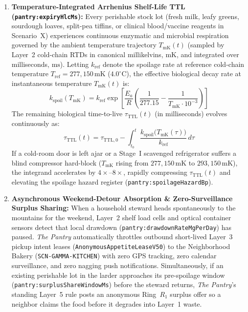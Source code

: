 \begin{enumerate}
    \item \textbf{Temperature-Integrated Arrhenius Shelf-Life TTL (\texttt{pantry:expiryHlcMs}):} Every perishable stock lot (fresh milk, leafy greens, sourdough loaves, split-pea tiffins, or clinical blood/vaccine reagents in Scenario~$\mathrm{X}$) experiences continuous enzymatic and microbial respiration governed by the ambient temperature trajectory $T_{\mathrm{mK}}(t)$ (sampled by Layer~2 cold-chain RTDs in canonical millikelvins, $\mathrm{mK}$, and integrated over milliseconds, $\mathrm{ms}$). Letting $k_{\mathrm{ref}}$ denote the spoilage rate at reference cold-chain temperature $T_{\mathrm{ref}} = 277{,}150\,\mathrm{mK}$ ($4.0^\circ\mathrm{C}$), the effective biological decay rate at instantaneous temperature $T_{\mathrm{mK}}(t)$ is:
    \begin{equation}
    k_{\mathrm{spoil}}(T_{\mathrm{mK}}) = k_{\mathrm{ref}} \exp\left[ \frac{E_a}{R} \left( \frac{1}{277.15} - \frac{1}{T_{\mathrm{mK}} \cdot 10^{-3}} \right) \right]
    \label{eq:pantry_arrhenius_rate}
    \end{equation}
    The remaining biological time-to-live $\tau_{\mathrm{TTL}}(t)$ (in milliseconds) evolves continuously as:
    \begin{equation}
    \tau_{\mathrm{TTL}}(t) = \tau_{\mathrm{TTL},0} - \int_{t_0}^{t} \frac{k_{\mathrm{spoil}}\bigl(T_{\mathrm{mK}}(\tau)\bigr)}{k_{\mathrm{ref}}} \, d\tau
    \label{eq:pantry_remaining_ttl_ms}
    \end{equation}
    If a cold-room door is left ajar or a Stage~I scavenged refrigerator suffers a blind compressor hard-block ($T_{\mathrm{mK}}$ rising from $277{,}150\,\mathrm{mK}$ to $293{,}150\,\mathrm{mK}$), the integrand accelerates by $4\times\text{--}8\times$, rapidly compressing $\tau_{\mathrm{TTL}}(t)$ and elevating the spoilage hazard register (\texttt{pantry:spoilageHazardBp}).
    \item \textbf{Asynchronous Weekend-Detour Absorption \& Zero-Surveillance Surplus Sharing:} When a household steward heads spontaneously to the mountains for the weekend, Layer~2 shelf load cells and optical container sensors detect that local drawdown (\texttt{pantry:drawdownRateMgPerDay}) has paused. \textit{The Pantry} automatically throttles outbound short-lived Layer~3 pickup intent leases (\texttt{AnonymousAppetiteLeaseV50}) to the Neighborhood Bakery (\texttt{SCN-GAMMA-KITCHEN}) with zero GPS tracking, zero calendar surveillance, and zero nagging push notifications. Simultaneously, if an existing perishable lot in the larder approaches its pre-spoilage window (\texttt{pantry:surplusShareWindowMs}) before the steward returns, \textit{The Pantry}'s standing Layer~5 rule posts an anonymous Ring~$R_1$ surplus offer so a neighbor claims the food before it degrades into Layer~1 waste.

\end{enumerate}
